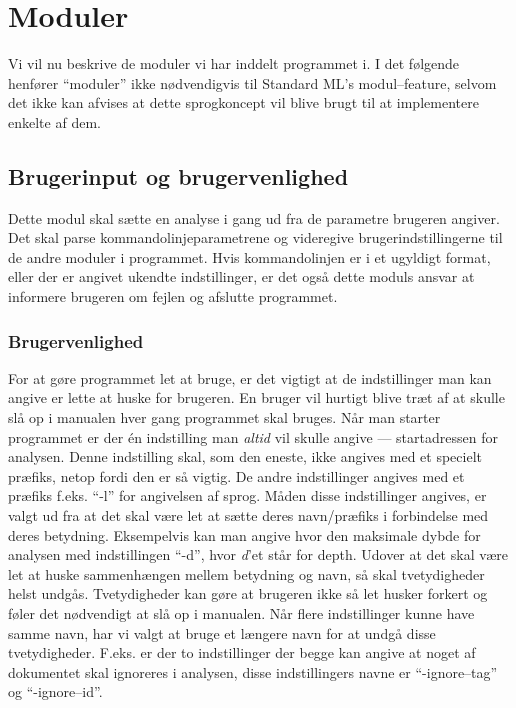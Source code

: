 \documentclass[a4paper,oneside,article]{memoir}
\begin{document}
\newpage
\section{Moduler}
Vi vil nu beskrive de moduler vi har inddelt programmet i. I det
følgende henfører ``moduler'' ikke nødvendigvis til Standard ML's
modul--feature, selvom det ikke kan afvises at dette sprogkoncept vil
blive brugt til at implementere enkelte af dem.

\subsection{Brugerinput og brugervenlighed}
Dette modul skal sætte en analyse i gang ud fra de parametre brugeren
angiver. Det skal parse kommandolinjeparametrene og videregive
brugerindstillingerne til de andre moduler i programmet. Hvis
kommandolinjen er i et ugyldigt format, eller der er angivet ukendte
indstillinger, er det også dette moduls ansvar at informere brugeren
om fejlen og afslutte programmet.

\subsubsection{Brugervenlighed}
For at gøre programmet let at bruge, er det vigtigt at de
indstillinger man kan angive er lette at huske for brugeren. En bruger
vil hurtigt blive træt af at skulle slå op i manualen hver gang
programmet skal bruges. Når man starter programmet er der én
indstilling man \textit{altid} vil skulle angive --- startadressen for
analysen. Denne indstilling skal, som den eneste, ikke angives med et
specielt præfiks, netop fordi den er så vigtig. De andre indstillinger
angives med et præfiks f.eks. ``-l'' for angivelsen af sprog. Måden
disse indstillinger angives, er valgt ud fra at det skal være let at
sætte deres navn/præfiks i forbindelse med deres
betydning. Eksempelvis kan man angive hvor den maksimale dybde for
analysen med indstillingen ``-d'', hvor \textit{d}'et står for
depth. Udover at det skal være let at huske sammenhængen mellem
betydning og navn, så skal tvetydigheder helst undgås. Tvetydigheder
kan gøre at brugeren ikke så let husker forkert og føler det
nødvendigt at slå op i manualen. Når flere indstillinger kunne have
samme navn, har vi valgt at bruge et længere navn for at undgå
disse tvetydigheder. F.eks. er der to indstillinger der begge kan
angive at noget af dokumentet skal ignoreres i analysen, disse
indstillingers navne er ``-ignore--tag'' og ``-ignore--id''.
\end{document}
